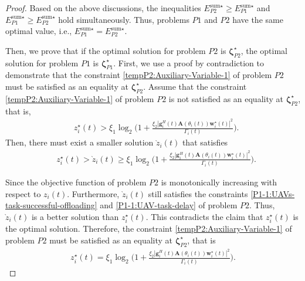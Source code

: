 \documentclass[10pt,journal,compsoc]{IEEEtran}
\newtheorem*{proof}{Proof}
\begin{document}
\begin{proof}
    Based on the above discussions, the inequalities ${E}_{P2}^{\text{sum} \star} \ge {E}_{P1}^{\text{sum} \star}$ and ${E}_{P1}^{\text{sum} \star} \ge {E}_{P2}^{\text{sum} \star}$ hold simultaneously. 
    Thus, problems $P1$ and $P2$ have the same optimal value, i.e., ${E}_{P1}^{\text{sum} \star} = {E}_{P2}^{\text{sum} \star}$.

    Then, we prove that if the optimal solution for problem $P2$ is ${\bm{\zeta}}^{\star}_{P2}$, the optimal solution for problem $P1$ is ${\bm{\zeta}}^{\star}_{P1}$.
    First, we use a proof by contradiction to demonstrate that the constraint \eqref{tempP2:Auxiliary-Variable-1} of problem $P2$ must be satisfied as an equality at ${\bm{\zeta}}^{\star}_{P2}$. 
    Assume that the constraint \eqref{tempP2:Auxiliary-Variable-1} of problem $P2$ is not satisfied as an equality at ${\bm{\zeta}}^{\star}_{P2}$, that is,
    \begin{align}
        & {z}^{\star}_{i}(t) > \xi_{1} \log_2 \Bigg(1 + \frac{\xi_{2} \left|\bm{g}^{H}_{i}(t)\mathbf{A}(\theta_{i}(t)) \bm{w}^{\star}_{i}(t)\right|^{2}}{\Gamma_{i}(t)}\Bigg).
    \end{align}
    Then, there must exist a smaller solution $\grave{z}_{i}(t)$ that satisfies
    \begin{align}
         & {z}^{\star}_{i}(t) > \grave{z}_{i}(t) \ge \xi_{1} \log_2 \Bigg(1 + \frac{\xi_{2} \left|\bm{g}^{H}_{i}(t)\mathbf{A}(\theta_{i}(t)) \bm{w}^{\star}_{i}(t)\right|^{2}}{\Gamma_{i}(t)}\Bigg).
    \end{align}

    Since the objective function of problem $P2$ is monotonically increasing with respect to $z_{i}(t)$. 
    Furthermore, $\grave{z}_{i}(t)$ still satisfies the constraints \eqref{P1-1:UAVs-task-successful-offloading} and \eqref{P1-1:UAV-task-delay} of problem $P2$. 
    Thus, $\grave{z}_{i}(t)$ is a better solution than ${z}^{\star}_{i}(t)$. 
    This contradicts the claim that ${z}^{\star}_{i}(t)$ is the optimal solution. 
    Therefore, the constraint \eqref{tempP2:Auxiliary-Variable-1} of problem $P2$ must be satisfied as an equality at ${\bm{\zeta}}^{\star}_{P2}$, that is
    \begin{align}\label{P1-1:Z-Equals}
        {z}^{\star}_{i}(t) = \xi_{1} \log_2 \Bigg(1 + \frac{\xi_{2} \left|\bm{g}^{H}_{i}(t)\mathbf{A}(\theta_{i}(t)) \bm{w}^{\star}_{i}(t)\right|^{2}}{\Gamma_{i}(t)}\Bigg).
    \end{align}


\end{proof}
\end{document}
